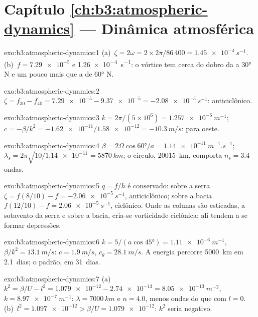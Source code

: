 \section*{Capítulo \ref{ch:b3:atmospheric-dynamics} --- Dinâmica atmosférica}

\begin{solution}{exo:b3:atmospheric-dynamics:1}
(a)~$\zeta = 2\omega = 2\times2\pi/86\,400 = \qty{1.45e-4}{s^{-1}}$.
(b)~$f = \num{7.29e-5}$ e \qty{1.26e-4}{s^{-1}}: o vórtice tem cerca do
dobro da  a \ang{30} N e um pouco mais que a de
\ang{60} N.
\end{solution}

\begin{solution}{exo:b3:atmospheric-dynamics:2}
$\zeta = f_{30} - f_{40} = \num{7.29e-5} - \num{9.37e-5} =
\qty{-2.08e-5}{s^{-1}}$: anticiclônico.
\end{solution}

\begin{solution}{exo:b3:atmospheric-dynamics:3}
$k = 2\pi/(5\times10^6) = \qty{1.257e-6}{m^{-1}}$; $c = -\beta/k^2 =
-\num{1.62e-11}/\num{1.58e-12} = \qty{-10.3}{m/s}$: para oeste.
\end{solution}

\begin{solution}{exo:b3:atmospheric-dynamics:4}
$\beta = 2\Omega\cos\ang{60}/a = \qty{1.14e-11}{m^{-1}.s^{-1}}$;
$\lambda_s = 2\pi\sqrt{10/\num{1.14e-11}} = \qty{5870}{km}$; o círculo,
\qty{20015}{km}, comporta $n_s = 3.4$ ondas.
\end{solution}

\begin{solution}{exo:b3:atmospheric-dynamics:5}
$q = f/h$ é conservado: sobre a serra $\zeta = f(8/10) - f =
\qty{-2.06e-5}{s^{-1}}$, anticiclônico; sobre a bacia $f(12/10) - f =
\qty{+2.06e-5}{s^{-1}}$, ciclônico. Onde as colunas são esticadas, a sotavento
da serra e sobre a bacia, cria-se vorticidade ciclônica: ali
tendem a se formar depressões.
\end{solution}

\begin{solution}{exo:b3:atmospheric-dynamics:6}
$k = 5/(a\cos\ang{45}) = \qty{1.11e-6}{m^{-1}}$, $\beta/k^2 =
\qty{13.1}{m/s}$: $c = \qty{1.9}{m/s}$, $c_g = \qty{28.1}{m/s}$. A energia
percorre \qty{5000}{km} em \num{2.1}~dias; o padrão, em \num{31}~dias.
\end{solution}

\begin{solution}{exo:b3:atmospheric-dynamics:7}
(a)~$k^2 = \beta/U - l^2 = \num{1.079e-12} - \num{2.74e-13} =
\qty{8.05e-13}{m^{-2}}$, $k = \qty{8.97e-7}{m^{-1}}$: $\lambda =
\qty{7000}{km}$ e $n = 4.0$, menos ondas do que com $l = 0$. (b)~$l^2 =
\num{1.097e-12} > \beta/U = \num{1.079e-12}$: $k^2$ seria negativo.
\end{solution}

